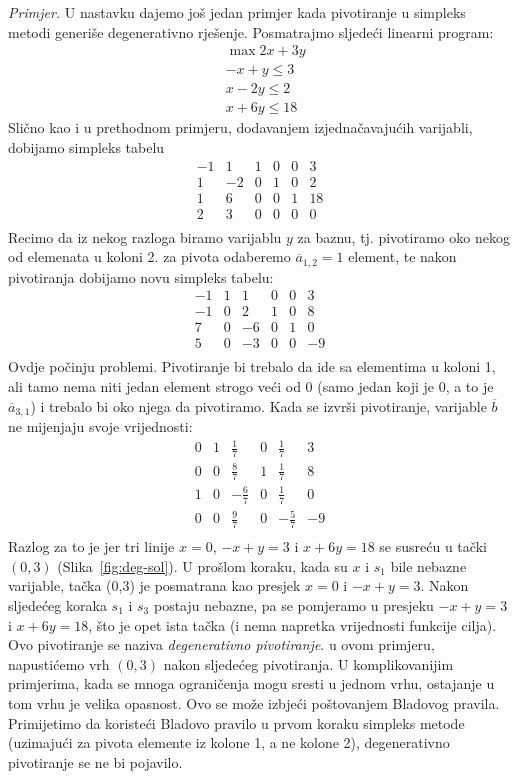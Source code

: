 \documentclass[a4paper, utf8, 11pt, colorlinks]{book}
\begin{document}
\emph{Primjer.} U nastavku dajemo još jedan primjer kada pivotiranje u simpleks metodi generiše degenerativno rješenje. 
Posmatrajmo sljedeći linearni program:
\begin{align*}
    &\max 2x + 3y \\
	& -x + y \leq 3 \\
	& x - 2y \leq 2 \\
	& x + 6y \leq 18
\end{align*}
Slično kao i u prethodnom primjeru, dodavanjem izjednačavajućih varijabli, dobijamo simpleks 
tabelu 
$$\begin{array}{ccccc|c}
     -1 & 1 & 1 & 0 & 0 & 3 \\
      1 &-2 & 0 & 1 & 0 & 2 \\
      1 & 6 & 0 & 0 & 1 & 18 \\ \hline
      2 & 3 & 0 & 0 & 0 & 0 \\
\end{array}$$
Recimo da iz nekog razloga biramo varijablu $y$ za baznu, tj. pivotiramo oko nekog od elemenata u koloni 2. za pivota odaberemo $\overline{a}_{1,2}=1$ element, te nakon pivotiranja dobijamo novu simpleks tabelu:
$$\begin{array}{ccccc|c}
	-1 & 1 & 1 & 0 & 0 & 3 \\
    -1 & 0 & 2 & 1 & 0 & 8 \\
    7 & 0 & -6 & 0 & 1 & 0 \\ \hline
    5 & 0 & -3 & 0 & 0 & -9 \\
\end{array}$$
Ovdje počinju problemi. Pivotiranje bi trebalo da ide sa elementima u koloni 1, ali tamo nema niti jedan element strogo veći od 0 (samo jedan koji je 0, a to je $\overline{a}_{3,1}$) i trebalo bi oko njega da pivotiramo. Kada se izvrši pivotiranje, varijable $\overline{b}$ ne mijenjaju svoje vrijednosti:
$$\begin{array}{ccccc|c}
     0 & 1 & \frac{1}{7}  & 0 & \frac{1}{7} & 3 \\
     0 & 0 & \frac{8}{7}  & 1 & \frac{1}{7} & 8 \\
     1 & 0 & -\frac{6}{7} & 0 & \frac{1}{7} & 0 \\ \hline
     0 & 0 & \frac{9}{7}  & 0 & -\frac{5}{7} & -9 \\
\end{array}$$
Razlog za to je jer tri linije $x=0$, $-x+y=3$ i $x+6y=18$ se susreću u tački $(0,3)$ (Slika~\ref{fig:deg-sol}). U prošlom koraku, kada su $x$ i $s_1$ bile nebazne varijable, tačka (0,3) je posmatrana kao presjek $x=0$ i $-x +y =3$. Nakon sljedećeg koraka $s_1$ i $s_3$ postaju nebazne, pa se pomjeramo u presjeku 
$-x+y=3$ i $x+6y=18$, što je opet ista tačka (i nema napretka vrijednosti funkcije cilja). 
 Ovo pivotiranje se naziva \emph{degenerativno pivotiranje}. u ovom primjeru, napustićemo vrh $(0,3)$ nakon sljedećeg pivotiranja. U komplikovanijim primjerima, kada se mnoga ograničenja mogu sresti u jednom vrhu, ostajanje u tom vrhu je velika opasnost. Ovo se može izbjeći poštovanjem 
 Bladovog pravila. Primijetimo da koristeći Bladovo pravilo u prvom koraku simpleks metode (uzimajući za pivota elemente iz kolone 1, a ne kolone 2), degenerativno pivotiranje se ne bi pojavilo.  
\end{document}

